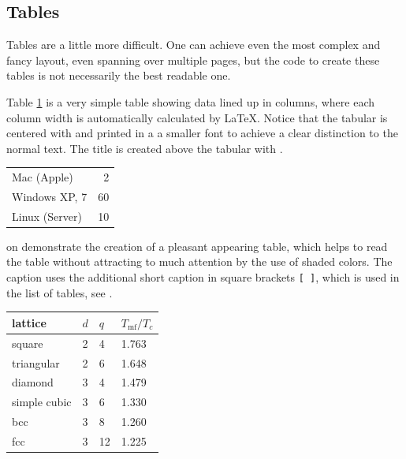 \subsection{Tables}
\label{sec:example:tables}
%
Tables are a little more difficult. One can achieve even the most complex and fancy layout, even spanning over multiple pages, but the code to create these tables is not necessarily the best readable one.

Table \ref{tab:Computers} is a very simple table showing data lined up in columns, where each column width is automatically calculated by LaTeX.
Notice that the tabular is centered with  and printed in a a smaller font to achieve a clear distinction to the normal text. The title is created above the tabular with .

\begin{table}[hb]
\centering
\small\renewcommand{\arraystretch}{1.4}  
\label{tab:Computers}
\begin{tabular}{lr}
\hline
Mac (Apple)    & 2  \\
Windows XP, 7  & 60 \\
Linux (Server) & 10 \\
\hline
\end{tabular}
\end{table}

 on  demonstrate the creation of a pleasant appearing table, which helps to read the table without attracting to much attention by the use of shaded colors. The caption uses the additional short caption in square brackets \texttt{[ ]}, which is used in the list of tables, see .

\begin{table}[ht]
\centering
\small\renewcommand{\arraystretch}{1.4}  
%
\label{tab:IsingModel}
%
\begin{tabularx}{0.5\textwidth}{lXXX}
\hline
\rowcolor{tableheadcolor}
lattice & $d$ & $q$ & $T_\text{mf}/T_c$ \\
\hline
square  & 2 & 4 & 1.763 \\
%
triangular & 2 & 6 & 1.648 \\
%
diamond & 3 & 4 & 1.479 \\
%
simple cubic & 3 & 6 & 1.330 \\
%
bcc & 3 & 8 & 1.260 \\
%
fcc & 3 & 12 & 1.225 \\
\hline
\end{tabularx}
\end{table}

